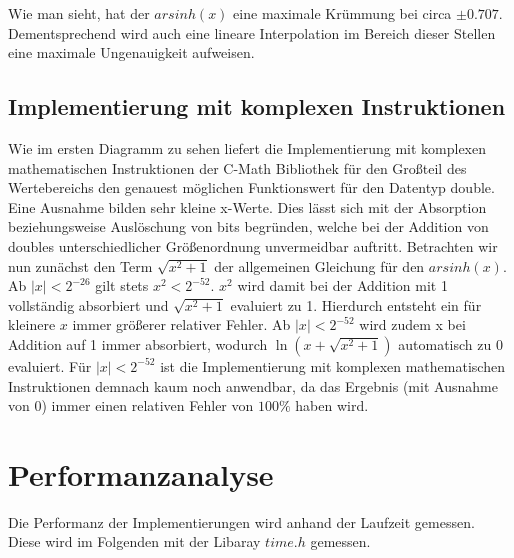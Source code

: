 \documentclass[course=erap] {aspdoc}
\begin{document}
     
 
     Wie man sieht, hat der $arsinh(x)$ eine maximale Krümmung bei circa $\pm 0.707$. Dementsprechend wird auch eine lineare Interpolation im Bereich dieser Stellen eine maximale Ungenauigkeit aufweisen.
     
     \subsection{Implementierung mit komplexen Instruktionen}
     Wie im ersten Diagramm zu sehen liefert die Implementierung mit komplexen mathematischen Instruktionen der C-Math Bibliothek für den Großteil des Wertebereichs den genauest möglichen Funktionswert für den Datentyp double. Eine Ausnahme bilden sehr kleine x-Werte. Dies lässt sich mit der Absorption beziehungsweise Auslöschung von bits begründen, welche bei der Addition von doubles unterschiedlicher Größenordnung unvermeidbar auftritt. Betrachten wir nun zunächst den Term $\sqrt{x^2 + 1}$ der allgemeinen Gleichung für den $arsinh(x)$. Ab $|x|<2^{-26}$ gilt stets $x^2<2^{-52}$. $x^2$ wird damit bei der Addition mit 1 vollständig absorbiert und $\sqrt{x^2 + 1}$ evaluiert zu 1. Hierdurch entsteht ein für kleinere $x$ immer größerer relativer Fehler. Ab $|x|<2^{-52}$ wird zudem x bei Addition auf 1 immer absorbiert, wodurch $\ln{(x+\sqrt{x^2 + 1})}$ automatisch zu 0 evaluiert. Für $|x|<2^{-52}$ ist die Implementierung mit komplexen mathematischen Instruktionen demnach kaum noch anwendbar, da das Ergebnis (mit Ausnahme von 0) immer einen relativen Fehler von $100\%$ haben wird.
     
     \section{Performanzanalyse}
     Die Performanz der Implementierungen wird anhand der Laufzeit gemessen.
     Diese wird im Folgenden mit der Libaray $time.h$ gemessen.
 
\end{document}
